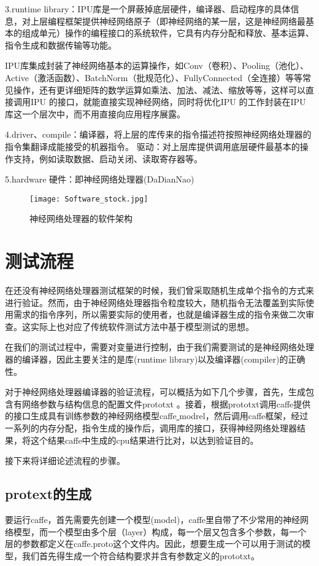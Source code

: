 3.runtime library：IPU库是一个屏蔽掉底层硬件，编译器、启动程序的具体信息，对上层编程框架提供神经网络原子（即神经网络的某一层，这是神经网络最基本的组成单元）操作的编程接口的系统软件，它具有内存分配和释放、基本运算、指令生成和数据传输等功能。

IPU库集成封装了神经网络基本的运算操作，如Conv（卷积）、Pooling（池化）、Active（激活函数）、BatchNorm（批规范化）、FullyConnected（全连接）等等常见操作，还有更详细矩阵的数学运算如乘法、加法、减法、缩放等等，这样可以直接调用IPU 的接口，就能直接实现神经网络，同时将优化IPU 的工作封装在IPU 库这一个层次中，而不用直接向应用程序展露。

4.driver、compile：编译器，将上层的库传来的指令描述符按照神经网络处理器的指令集翻译成能接受的机器指令。
驱动：对上层库提供调用底层硬件最基本的操作支持，例如读取数据、启动关闭、读取寄存器等。

5.hardware 硬件：即神经网络处理器(DaDianNao)

\begin{figure}[!htbp]
\centering
\texttt{[image: Software\_stock.jpg]}
\caption{神经网络处理器的软件架构}
\label{fig:Software stock}
\end{figure}

\section{测试流程}
在还没有神经网络处理器测试框架的时候，我们曾采取随机生成单个指令的方式来进行验证。然而，由于神经网络处理器指令粒度较大，随机指令无法覆盖到实际使用需求的指令序列，所以需要实际的使用者，也就是编译器生成的指令来做二次审查。这实际上也对应了传统软件测试方法中基于模型测试的思想。

在我们的测试过程中，需要对变量进行控制，由于我们需要测试的是神经网络处理器的编译器，因此主要关注的是库(runtime library)以及编译器(compiler)的正确性。

对于神经网络处理器编译器的验证流程，可以概括为如下几个步骤，首先，生成包含有网络参数与结构信息的配置文件prototxt 。接着，根据prototxt调用caffe提供的接口生成具有训练参数的神经网络模型caffe\underline{ }modrel，然后调用caffe框架，经过一系列的内存分配，指令生成的操作后，调用库的接口，获得神经网络处理器结果，将这个结果caffe中生成的cpu结果进行比对，以达到验证目的。

接下来将详细论述流程的步骤。
\subsection{protext的生成}
要运行caffe，首先需要先创建一个模型(model)，caffe里自带了不少常用的神经网络模型，而一个模型由多个层（layer）构成，每一个层又包含多个参数，每一个层的参数都定义在caffe.proto这个文件内。因此，想要生成一个可以用于测试的模型，我们首先得生成一个符合结构要求并含有参数定义的prototxt。

